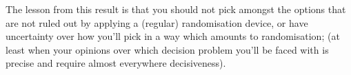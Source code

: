 \documentclass[a4paper]{article}
\newtheorem{proposition}[theorem]{Proposition}
\newcommand\D{\mathcal{D}}
\newcommand\N{\mathbf{N}}
\renewcommand\P{\mathbb{P}} %
\renewcommand\c{\mathsf{c}} %
\newcommand\Exp{\mathsf{Exp}}
\newcommand\EU{\mathrm{EU}}
\newcommand\U{\mathfrak{U}} %
\newcommand\Maximality{\mathrm{Max}}
\newcommand\Maximin{\Gamma}
\newcommand{\IB}{\mathbb{B}}
\newcommand{\IP}{\P}
\newcommand{\todoinfo}[2][]{\todo[backgroundcolor=orange!80,bordercolor=black,linecolor=gray!80, #1,inline,caption={}]{#2}}
\renewcommand{\color}[1]{}
\newcommand\SetDelimiter[1][]{
	\nonscript\,#1\vert \allowbreak \nonscript\,\mathopen{}}
\providecommand\given{\SetDelimiter}
\newenvironment{CCM rewritten}
{\begingroup\color{blue}} %
{\endgroup}              %
\begin{document}
{\color{blue}
	The lesson from this result is that you should not pick amongst the options that are not ruled out by applying a (regular) randomisation device, or have uncertainty over how you'll pick in a way which amounts to randomisation; (at least when your opinions over which decision problem you'll be faced with is precise and require almost everywhere decisiveness). 
}




%
%
%
%	
%	
%
%
%
\end{document}
